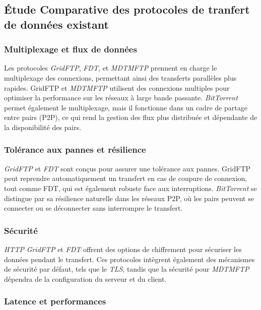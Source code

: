 \subsection{Étude Comparative des protocoles de tranfert de données existant}
\subsubsection{Multiplexage et flux de données}

Les protocoles \textit{GridFTP}, \textit{FDT}, et \textit{MDTMFTP} prennent en charge le multiplexage des connexions, permettant ainsi des transferts parallèles plus rapides. GridFTP et \textit{MDTMFTP} utilisent des connexions multiples pour optimiser la performance sur les réseaux à large bande passante\cite{gridFTP, nadig2018comparative}. \textit{BitTorrent} permet également le multiplexage, mais il fonctionne dans un cadre de partage entre pairs (P2P), ce qui rend la gestion des flux plus distribuée et dépendante de la disponibilité des pairs.

\subsubsection{Tolérance aux pannes et résilience}

\textit{GridFTP} et \textit{FDT} sont conçus pour assurer une tolérance aux pannes. GridFTP peut reprendre automatiquement un transfert en cas de coupure de connexion\cite{gridFTP}, tout comme FDT, qui est également robuste face aux interruptions. \textit{BitTorrent} se distingue par sa résilience naturelle dans les réseaux P2P, où les pairs peuvent se connecter ou se déconnecter sans interrompre le transfert\cite{wikipedia-contributors-2024-bitorrent}.

\subsubsection{Sécurité}

\textit{HTTP} \textit{GridFTP} et \textit{FDT} offrent des options de chiffrement pour sécuriser les données pendant le transfert. Ces protocoles intègrent également des mécanismes de sécurité par défaut, tels que le \textit{TLS}, tandis que la sécurité pour \textit{MDTMFTP} dépendra de la configuration du serveur et du client.

\subsubsection{Latence et performances}


